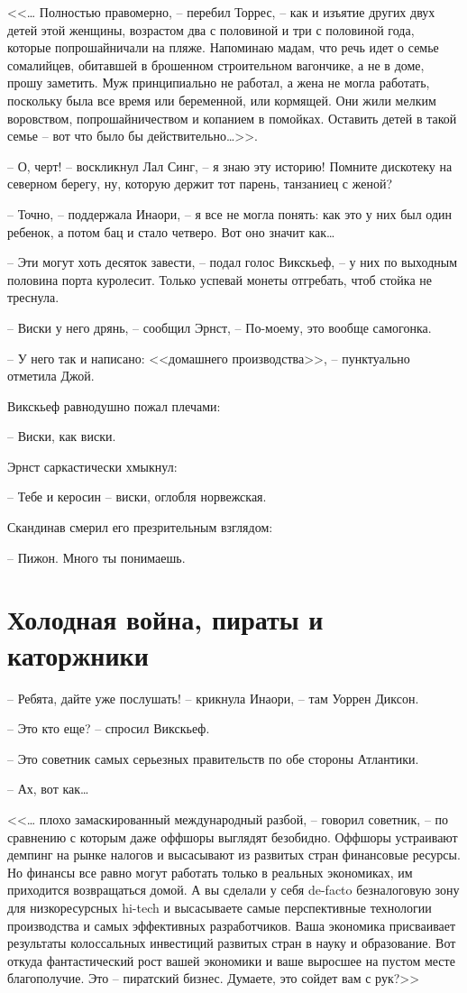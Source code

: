 <<\ldots{} Полностью правомерно, -- перебил Торрес, -- как и изъятие других двух детей этой женщины, возрастом два с половиной и три с половиной года, которые попрошайничали на пляже. Напоминаю мадам, что речь идет о семье сомалийцев, обитавшей в брошенном строительном вагончике, а не в доме, прошу заметить. Муж принципиально не работал, а жена не могла работать, поскольку была все время или беременной, или кормящей. Они жили мелким воровством, попрошайничеством и копанием в помойках. Оставить детей в такой семье -- вот что было бы действительно\ldots{}>>.

-- О, черт! -- воскликнул Лал Синг, -- я знаю эту историю! Помните дискотеку на северном берегу, ну, которую держит тот парень, танзаниец с женой?

-- Точно, -- поддержала Инаори, -- я все не могла понять: как это у них был один ребенок, а потом бац и стало четверо. Вот оно значит как\ldots{}

-- Эти могут хоть десяток завести, -- подал голос Викскьеф, -- у них по выходным половина порта куролесит. Только успевай монеты отгребать, чтоб стойка не треснула.

-- Виски у него дрянь, -- сообщил Эрнст, -- По-моему, это вообще самогонка.

-- У него так и написано: <<домашнего производства>>, -- пунктуально отметила Джой.

Викскьеф равнодушно пожал плечами:

-- Виски, как виски.

Эрнст саркастически хмыкнул:

-- Тебе и керосин -- виски, оглобля норвежская.

Скандинав смерил его презрительным взглядом:

-- Пижон. Много ты понимаешь.


\chapter{Холодная война, пираты и каторжники}


-- Ребята, дайте уже послушать! -- крикнула Инаори, -- там Уоррен Диксон.

-- Это кто еще? -- спросил Викскьеф.

-- Это советник самых серьезных правительств по обе стороны Атлантики.

-- Ах, вот как\ldots{}

<<\ldots{} плохо замаскированный международный разбой, -- говорил советник, -- по сравнению с которым даже оффшоры выглядят безобидно. Оффшоры устраивают демпинг на рынке налогов и высасывают из развитых стран финансовые ресурсы. Но финансы все равно могут работать только в реальных экономиках, им приходится возвращаться домой. А вы сделали у себя de-facto безналоговую зону для низкоресурсных hi-tech и высасываете самые перспективные технологии производства и самых эффективных разработчиков. Ваша экономика присваивает результаты колоссальных инвестиций развитых стран в науку и образование. Вот откуда фантастический рост вашей экономики и ваше выросшее на пустом месте благополучие. Это -- пиратский бизнес. Думаете, это сойдет вам с рук?>>

